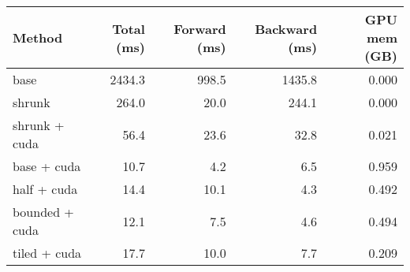 \begin{tabular}{lrrrr}
\hline
 Method         &   Total (ms) &   Forward (ms) &   Backward (ms) &   GPU mem (GB) \\
\hline
 base           &       2434.3 &          998.5 &          1435.8 &          0.000 \\
 shrunk         &        264.0 &           20.0 &           244.1 &          0.000 \\
 shrunk + cuda  &         56.4 &           23.6 &            32.8 &          0.021 \\
 base + cuda    &         10.7 &            4.2 &             6.5 &          0.959 \\
 half + cuda    &         14.4 &           10.1 &             4.3 &          0.492 \\
 bounded + cuda &         12.1 &            7.5 &             4.6 &          0.494 \\
 tiled + cuda   &         17.7 &           10.0 &             7.7 &          0.209 \\
\hline
\end{tabular}
